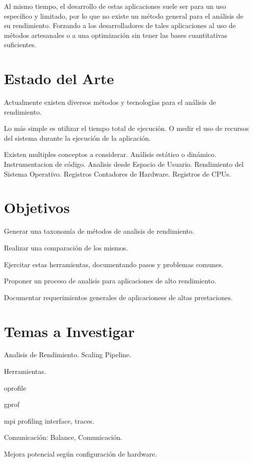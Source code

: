 \documentclass[a4paper,twocolumn]{article}
\begin{document}
Al mismo tiempo, el desarrollo de estas aplicaciones suele ser para un uso espec\'ifico y limitado, por lo que no existe un m\'etodo general para el an\'alisis de su rendimiento. Forzando a los desarrolladores de tales aplicaciones al uso de m\'etodos artesanales o a una optimizaci\'on sin tener las bases cuantitativas suficientes.

\section{Estado del Arte}

Actualmente existen diversos m\'etodos y tecnolog\'ias para el an\'alisis de rendimiento.

Lo m\'as simple es utilizar el tiempo total de ejecuci\'on. O medir el uso de recursos del sistema durante la ejecuci\'on de la aplicaci\'on.

Existen multiples conceptos a considerar.
An\'alisis est\'atico o din\'amico.
Instrumentacion de c\'odigo.
Analisis desde Espacio de Usuario.
Rendimiento del Sistema Operativo.
Registros Contadores de Hardware. Registros de CPUs.

\section{Objetivos}

Generar una taxonom\'ia de m\'etodos de analisis de rendimiento.

Realizar una comparaci\'on de los mismos.

Ejercitar estas herramientas, documentando pasos y problemas comunes.

Proponer un proceso de analisis para aplicaciones de alto rendimiento.

Documentar requerimientos generales de aplicacioness de altas prestaciones.

\section{Temas a Investigar}

Analisis de Rendimiento.
Scaling
Pipeline.

Herramientas.

oprofile \cite{oprofile}

gprof \cite{gprof}

mpi profiling interface, traces. \cite{mpi}

Comunicaci\'on: Balance, Comunicaci\'on.

Mejora potencial seg\'un configuraci\'on de hardware.
\end{document}
